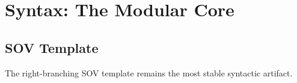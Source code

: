 \chapter{Syntax: The Modular Core}\section{SOV Template}The right-branching SOV template remains the most stable syntactic artifact.